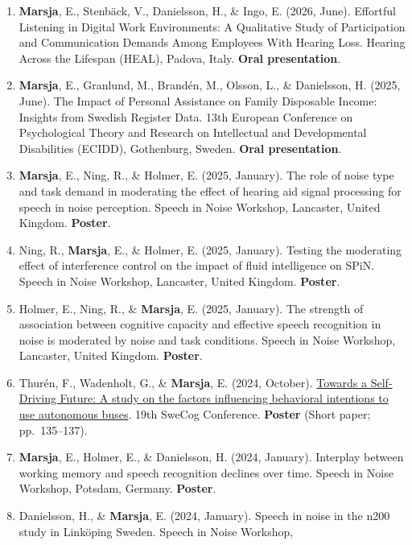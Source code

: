 \documentclass[]{article}
\begin{document}
\begin{enumerate}
\def\labelenumi{\arabic{enumi}.}
\item
  \textbf{Marsja}, E., Stenbäck, V., Danielsson, H., \& Ingo, E. (2026,
  June). Effortful Listening in Digital Work Environments: A Qualitative
  Study of Participation and Communication Demands Among Employees With
  Hearing Loss. Hearing Across the Lifespan (HEAL), Padova, Italy.
  \textbf{Oral presentation}.
\item
  \textbf{Marsja}, E., Granlund, M., Brandén, M., Olsson, L., \&
  Danielsson, H. (2025, June). The Impact of Personal Assistance on
  Family Disposable Income: Insights from Swedish Register Data. 13th
  European Conference on Psychological Theory and Research on
  Intellectual and Developmental Disabilities (ECIDD), Gothenburg,
  Sweden. \textbf{Oral presentation}.
\item
  \textbf{Marsja}, E., Ning, R., \& Holmer, E. (2025, January). The role
  of noise type and task demand in moderating the effect of hearing aid
  signal processing for speech in noise perception. Speech in Noise
  Workshop, Lancaster, United Kingdom. \textbf{Poster}.
\item
  Ning, R., \textbf{Marsja}, E., \& Holmer, E. (2025, January). Testing
  the moderating effect of interference control on the impact of fluid
  intelligence on SPiN. Speech in Noise Workshop, Lancaster, United
  Kingdom. \textbf{Poster}.
\item
  Holmer, E., Ning, R., \& \textbf{Marsja}, E. (2025, January). The
  strength of association between cognitive capacity and effective
  speech recognition in noise is moderated by noise and task conditions.
  Speech in Noise Workshop, Lancaster, United Kingdom. \textbf{Poster}.
\item
  Thurén, F., Wadenholt, G., \& \textbf{Marsja}, E. (2024, October).
  \href{https://swecog.se/files/SweCog2024_Proceedings.pdf}{Towards a
  Self-Driving Future: A study on the factors influencing behavioral
  intentions to use autonomous buses}. 19th SweCog Conference.
  \textbf{Poster} (Short paper; pp.~135--137).
\item
  \textbf{Marsja}, E., Holmer, E., \& Danielsson, H. (2024, January).
  Interplay between working memory and speech recognition declines over
  time. Speech in Noise Workshop, Potsdam, Germany. \textbf{Poster}.
\item
  Danielsson, H., \& \textbf{Marsja}, E. (2024, January). Speech in
  noise in the n200 study in Linköping Sweden. Speech in Noise Workshop,

\end{enumerate}
\end{document}
